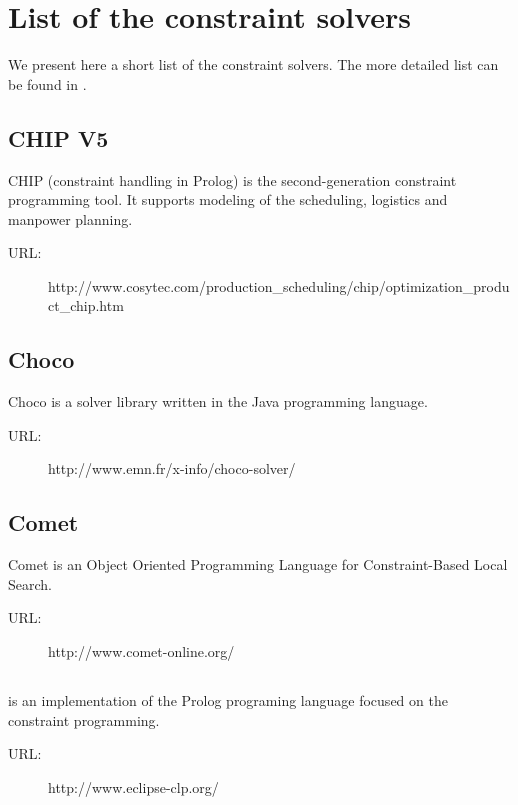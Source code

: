 \chapter{List of the constraint solvers}
\label{list-of-solvers}

We present here a short list of the constraint solvers. The more detailed list can be
found in \cite{bartak:los}.

\section*{CHIP V5}
CHIP (constraint handling in Prolog) is the second-generation constraint programming 
tool. It supports modeling of the scheduling, logistics and manpower planning. 

\begin{description}
	\item[URL:] http://www.cosytec.com/pro\-duction\_sche\-duling/chip/opti\-miza\-tion\_pro\-duct\_chip.htm
\end{description}  

\section*{Choco}
Choco is a solver library written in the Java programming language.

\begin{description}
	\item[URL:] http://www.emn.fr/x-info/choco-solver/	
\end{description}  

\section*{Comet}
Comet is an Object Oriented Programming Language for Constraint-Based Local Search.

\begin{description}
	\item[URL:] http://www.comet-online.org/
\end{description} 

\section*{\eclipse}
\eclipse is an implementation of the Prolog programing language focused on the constraint 
programming. 

\begin{description}
	\item[URL:] http://www.eclipse-clp.org/
\end{description}  

